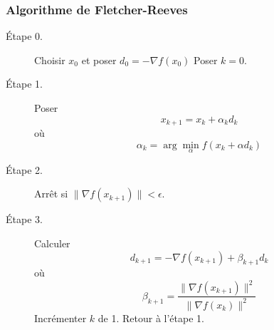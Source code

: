 \documentclass[usepdftitle=false,aspectratio=169]{beamer}
\begin{document}
\begin{frame}
	\frametitle{Algorithme de Fletcher-Reeves}
	
	\begin{description}
		\item[Étape 0.]
		Choisir $x_0$ et poser $d_0 = -\nabla f (x_0)$
		Poser $k = 0$.
		\item[Étape 1.]
		Poser
		$$
		x_{k+1} = x_k + \alpha_{k}d_k
		$$
		où
		$$
		\alpha_k = \arg \min_{\alpha} f (x_k + \alpha d_k )
		$$
		\item[Étape 2.]
Arrêt si $\| \nabla f(x_{k+1}) \| < \epsilon$.
		\item[Étape 3.]
Calculer
$$
d_{k+1} = - \nabla f(x_{k+1})+ \beta_{k+1} d_{k}
$$
où
$$
\beta_{k+1} = \frac{\| \nabla f(x_{k+1}) \|^2}{\| \nabla f(x_{k}) \|^2}
$$
Incrémenter $k$ de 1.
Retour à l'étape 1.
	\end{description}
	
\end{frame}
\end{document}
